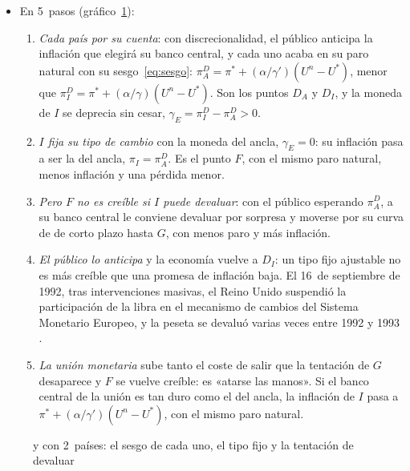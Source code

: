 \documentclass[11pt]{article}
\begin{document}
\begin{itemize}
\item En 5~pasos (gráfico~\ref{fig:credibilidad}):
  \begin{enumerate}
  \item \emph{Cada país por su cuenta}: con discrecionalidad, el público anticipa la inflación que elegirá su banco central, y cada uno acaba en su paro natural con su sesgo~\eqref{eq:sesgo}: $\pi^D_A=\pi^*+(\alpha/\gamma')(U^n-U^*)$, menor que $\pi^D_I=\pi^*+(\alpha/\gamma)(U^n-U^*)$. Son los puntos $D_A$ y $D_I$, y la moneda de $I$ se deprecia sin cesar, $\gamma_E=\pi^D_I-\pi^D_A>0$.
  \item \emph{$I$ fija su tipo de cambio} con la moneda del ancla, $\gamma_E=0$: su inflación pasa a ser la del ancla, $\pi_I=\pi^D_A$. Es el punto $F$, con el mismo paro natural, menos inflación y una pérdida menor.
  \item \emph{Pero $F$ no es creíble si $I$ puede devaluar}: con el público esperando $\pi^D_A$, a su banco central le conviene devaluar por sorpresa y moverse por su curva de  de corto plazo hasta $G$, con menos paro y más inflación.
  \item \emph{El público lo anticipa} y la economía vuelve a $D_I$: un tipo fijo ajustable no es más creíble que una promesa de inflación baja. El 16~de septiembre de 1992, tras intervenciones masivas, el Reino Unido suspendió la participación de la libra en el mecanismo de cambios del Sistema Monetario Europeo\nocite{BoE1992Operation}, y la peseta se devaluó varias veces entre 1992 y 1993\nocite{EichengreenWyplosz1993Unstable} .
  \item \emph{La unión monetaria} sube tanto el coste de salir que la tentación de $G$ desaparece y $F$ se vuelve creíble: es «atarse las manos». Si el banco central de la unión es tan duro como el del ancla, la inflación de $I$ pasa a $\pi^*+(\alpha/\gamma')(U^n-U^*)$, con el mismo paro natural.
  \end{enumerate}
\end{itemize}

\begin{figure}[H]
\centering
\caption{ y  con 2~países: el sesgo de cada uno, el tipo fijo y la tentación de devaluar}\label{fig:credibilidad}
\end{figure}
\end{document}
